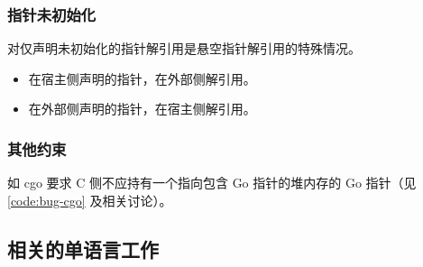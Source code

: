 \subsubsection{指针未初始化}

对仅声明未初始化的指针解引用是悬空指针解引用的特殊情况。

\begin{itemize}
\item 在宿主侧声明的指针，在外部侧解引用。
\item 在外部侧声明的指针，在宿主侧解引用。
\end{itemize}

\subsubsection{其他约束}

如 cgo 要求 C 侧不应持有一个指向包含 Go 指针的堆内存的 Go 指针（见 \autoref{code:bug-cgo} 及相关讨论）。

\subsection{相关的单语言工作}
\label{sec:singlelang}

